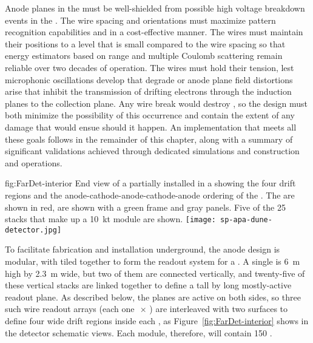Anode planes in the  must be well-shielded from possible high voltage breakdown events in the .  The  wire spacing and orientations must maximize pattern recognition capabilities and  in a cost-effective manner.  The  wires must maintain their positions to a level that is small compared to the wire spacing so that energy estimators based on range and multiple Coulomb scattering remain reliable over two decades of operation.  The wires must hold their tension, lest microphonic oscillations develop that degrade  or anode plane field distortions arise that inhibit the transmission of drifting electrons through the induction planes to the collection plane.  Any wire break would destroy , so the  design must both minimize the possibility of this occurrence and contain the extent of any damage that would ensue should it happen.  An  implementation that meets all these goals follows in the remainder of this chapter, along with a summary of significant validations achieved through dedicated simulations and  construction and operations.

\begin{dunefigure}{fig:FarDet-interior}
{End view of a partially installed   in a   showing the four drift regions and the anode-cathode-anode-cathode-anode ordering of the  . The  are shown in red,  are shown with a green frame and gray panels. Five of the 25  stacks that make up a \SI{10}{kt}  module are shown.}
\texttt{[image: sp-apa-dune-detector.jpg]}
\end{dunefigure}

To facilitate fabrication and installation underground, the anode design is modular, with  tiled together to form the readout system for a \nominalmodsize {}. A single  is \SI{6}{m} high by \SI{2.3}{m} wide, but two of them are connected vertically, and twenty-five of these vertical stacks are linked together to define a \tpcheight %
tall by \sptpclen %
long mostly-active readout plane.  As described below, the planes are active on both sides, so three such wire readout arrays (each one \tpcheight$\,\times\,$\sptpclen) %
are interleaved with two  surfaces to define four \spmaxdrift %
wide drift regions inside each , as Figure~\ref{fig:FarDet-interior} shows in the detector schematic views. Each  \nominalmodsize module, therefore, will contain 150 .

